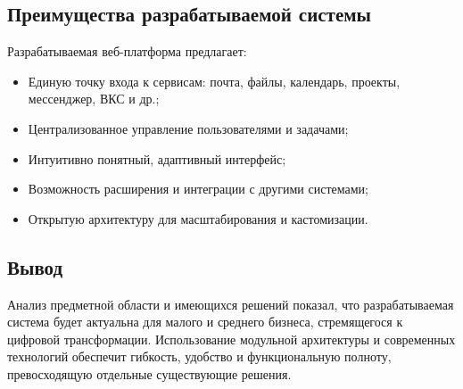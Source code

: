 \subsection{Преимущества разрабатываемой системы}

Разрабатываемая веб-платформа предлагает:
\begin{itemize}
  \item Единую точку входа к сервисам: почта, файлы, календарь, проекты, мессенджер, ВКС и др.;
  \item Централизованное управление пользователями и задачами;
  \item Интуитивно понятный, адаптивный интерфейс;
  \item Возможность расширения и интеграции с другими системами;
  \item Открытую архитектуру для масштабирования и кастомизации.
\end{itemize}

\subsection{Вывод}

Анализ предметной области и имеющихся решений показал, что разрабатываемая система будет актуальна для малого и среднего бизнеса, стремящегося к цифровой трансформации. Использование модульной архитектуры и современных технологий обеспечит гибкость, удобство и функциональную полноту, превосходящую отдельные существующие решения.